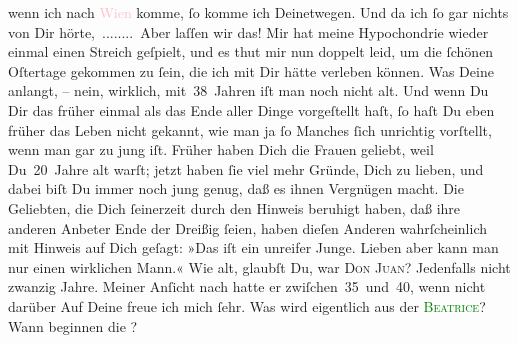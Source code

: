                wenn ich nach \textcolor{pink}{Wien}{}\ledrightnote{\textcolor{pink}{Wien}} komme, ſo komme ich
               Deinetwegen. Und da ich ſo gar nichts von Dir hörte, ........ Aber laſſen wir das! Mir hat meine Hypochondrie wieder einmal \strikeout{\textcolor{gray}{×}\-\textcolor{gray}{×}} einen Streich geſpielt, und es thut mir nun doppelt leid, um die ſchönen
               Oſtertage gekommen zu ſein, {\pb}die ich mit Dir hätte
               verleben können.\pend
           \pstart
           Was Deine \label{K_L02911-2v}\label{K_L02911-2h} anlangt, – nein, wirklich, mit 38 Jahren iſt man noch nicht alt. Und wenn Du
               Dir das früher einmal als das Ende aller Dinge vorgeſtellt haſt, ſo haſt Du eben
               früher das Leben nicht gekannt, wie man ja ſo Manches ſich unrichtig vorſtellt, wenn
               man gar zu jung iſt. Früher haben Dich die Frauen geliebt, weil Du 20 Jahre alt
               warſt; jetzt haben ſie viel mehr Gründe, Dich zu lieben, und dabei biſt Du immer noch
               jung genug, daß es ihnen Vergnügen macht. Die Geliebten, die Dich ſeinerzeit durch
                  \introOben{}den\introOben{} Hinweis 
               beruhigt haben, daß ihre anderen Anbeter Ende der Dreißig ſeien, haben dieſen Anderen
               wahrſcheinlich mit Hinweis auf Dich geſagt: »Das iſt {\pb}ein unreifer Junge. Lieben aber kann man nur einen wirklichen Mann.« Wie alt,
               glaubſt Du, war \textsc{Don Juan}? Jedenfalls nicht zwanzig Jahre.
               Meiner Anſicht nach hatte er zwiſchen 35 und 40, wenn nicht darüber{\dotsseven}\pend
           \pstart
           Auf Deine \label{K_L02911-3v}\label{K_L02911-3h} freue ich mich ſehr. Was wird eigentlich aus der \textsc{\textcolor{green}{Beatrice}{}\ledrightnote{\textcolor{green}{Der Schleier der Beatrice. Schauspiel in fünf Akten}}}? Wann beginnen die \label{K_L02911-4v}\label{K_L02911-4h}?\pend
